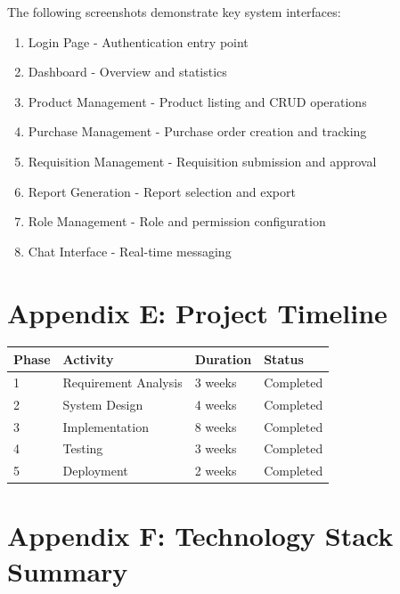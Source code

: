 The following screenshots demonstrate key system interfaces:

\begin{enumerate}
    \item Login Page - Authentication entry point
    \item Dashboard - Overview and statistics
    \item Product Management - Product listing and CRUD operations
    \item Purchase Management - Purchase order creation and tracking
    \item Requisition Management - Requisition submission and approval
    \item Report Generation - Report selection and export
    \item Role Management - Role and permission configuration
    \item Chat Interface - Real-time messaging
\end{enumerate}

\section{Appendix E: Project Timeline}

\begin{table}[h]
\centering
\begin{tabular}{|p{2cm}|p{3cm}|p{3cm}|p{2cm}|}
\hline
\textbf{Phase} & \textbf{Activity} & \textbf{Duration} & \textbf{Status}\\
\hline
1 & Requirement Analysis & 3 weeks & Completed\\
\hline
2 & System Design & 4 weeks & Completed\\
\hline
3 & Implementation & 8 weeks & Completed\\
\hline
4 & Testing & 3 weeks & Completed\\
\hline
5 & Deployment & 2 weeks & Completed\\
\hline
\end{tabular}
\end{table}

\section{Appendix F: Technology Stack Summary}

